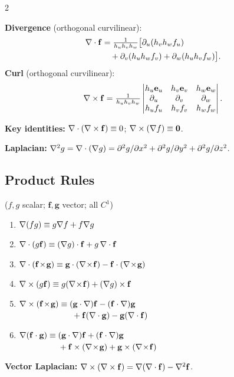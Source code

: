 \documentclass[10pt,a4paper]{article}
\newcommand{\vf}{\mathbf{f}}
\newcommand{\vg}{\mathbf{g}}
\newcommand{\eu}{\mathbf{e}_u}
\newcommand{\ev}{\mathbf{e}_v}
\newcommand{\ew}{\mathbf{e}_w}
\begin{document}
\begin{multicols}{2}
\begin{defbox}
\textbf{Divergence} (orthogonal curvilinear):
\begin{align*}
  \bnabla\cdot\vf &= \tfrac{1}{h_uh_vh_w}
     \bigl[\partial_u(h_vh_wf_u)\\
     &\quad+\partial_v(h_uh_wf_v)
     +\partial_w(h_uh_vf_w)\bigr].
\end{align*}
\textbf{Curl} (orthogonal curvilinear):
\[
  \bnabla\times\vf = \tfrac{1}{h_uh_vh_w}
  \begin{vmatrix}
    h_u\eu & h_v\ev & h_w\ew\\
    \partial_u & \partial_v & \partial_w\\
    h_uf_u & h_vf_v & h_wf_w
  \end{vmatrix}.
\]

\textbf{Key identities:}
$\bnabla\cdot(\bnabla\times\vf)\equiv 0$;\quad
$\mathbf{\nabla}\times(\mathbf{\nabla} f)\equiv\mathbf{0}$.

\textbf{Laplacian:}
$\mathbf{\nabla}^2g=\mathbf{\nabla}\cdot(\mathbf{\nabla} g)
 =\partial^2g/\partial x^2
  +\partial^2g/\partial y^2
  +\partial^2g/\partial z^2$.
\end{defbox}

\subsection{Product Rules}
\noindent($f,g$ scalar; $\vf,\vg$ vector; all $C^1$)
\begin{enumerate}[label=(\roman*)]
  \item $\mathbf{\nabla}(fg)\equiv g\mathbf{\nabla} f+f\mathbf{\nabla} g$
  \item $\bnabla\cdot(g\vf)\equiv(\bnabla g)\cdot\vf+g\,\bnabla\cdot\vf$
  \item $\bnabla\cdot(\vf\!\times\!\vg)\equiv\vg\cdot(\bnabla\!\times\!\vf)-\vf\cdot(\bnabla\!\times\!\vg)$
  \item $\bnabla\times(g\vf)\equiv g(\bnabla\!\times\!\vf)+(\bnabla g)\times\vf$
  \item $\bnabla\times(\vf\!\times\!\vg)\equiv(\vg\cdot\bnabla)\vf-(\vf\cdot\bnabla)\vg$\\
        $\hphantom{\bnabla\times(\vf\times\vg)\equiv{}}+\vf(\bnabla\cdot\vg)-\vg(\bnabla\cdot\vf)$
  \item $\bnabla(\vf\cdot\vg)\equiv(\vg\cdot\bnabla)\vf+(\vf\cdot\bnabla)\vg$\\
        $\hphantom{\bnabla(\vf\cdot\vg)\equiv{}}+\vf\times(\bnabla\!\times\!\vg)+\vg\times(\bnabla\!\times\!\vf)$
\end{enumerate}
\textbf{Vector Laplacian:}
$\bnabla\times(\bnabla\times\vf)=\bnabla(\bnabla\cdot\vf)-\bnabla^2\vf$.


\end{multicols}
\end{document}
